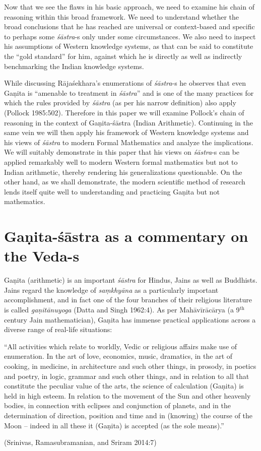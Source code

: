 Now that we see the flaws in his basic approach, we need to examine his chain of reasoning within this broad framework. We need to understand whether the broad conclusions that he has reached are universal or context-based and specific to perhaps some {\sl śāstra}-s only under some circumstances.  We also need to inspect his assumptions of Western knowledge systems, as that can be said to constitute the ``gold standard'' for him, against which he is directly as well as indirectly benchmarking the Indian knowledge systems.

While discussing Rājaśekhara’s enumerations of {\sl śāstra}-s he observes that even Gaṇita is ``amenable to treatment in {\sl śāstra}'' and is one of the many practices for which the rules provided by {\sl śāstra} (as per his narrow definition) also apply (Pollock 1985:502). Therefore in this paper we will examine Pollock’s chain of reasoning in the context of Gaṇita-śāstra (Indian Arithmetic). Continuing in the same vein we will then apply his framework of Western knowledge systems and his views of {\sl śāstra} to modern Formal Mathematics and analyze the implications. We will suitably demonstrate in this paper that his views on {\sl śāstra}-s can be applied remarkably well to modern Western formal mathematics but not to Indian arithmetic, thereby rendering his generalizations questionable. On the other hand, as we shall demonstrate, the modern scientific method of research lends itself quite well to understanding and practicing Gaṇita but not mathematics.

\section*{Gaṇita-śāstra as a commentary on the Veda-s}

Gaṇita (arithmetic) is an important {\sl śāstra} for Hindus, Jains as well as Buddhists. Jains regard the knowledge of {\sl saṃkhyāna} as a particularly important accomplishment, and in fact one of the four branches of their religious literature is called {\sl gaṇitānuyoga} (Datta and Singh 1962:4). As per Mahāvīrācārya (a 9$^{\text{th}}$ century Jain mathematician), Gaṇita has immense practical applications across a diverse range of real-life situations: 
\begin{myquote}
``All activities which relate to worldly, Vedic or religious affairs make use of enumeration. In the art of love, economics, music, dramatics, in the art of cooking, in medicine, in architecture and such other things, in prosody, in poetics and poetry, in logic, grammar and such other things, and in relation to all that constitute the peculiar value of the arts, the science of calculation (Gaṇita) is held in high esteem. In relation to the movement of the Sun and other heavenly bodies, in connection with eclipses and conjunction of planets, and in the determination of direction, position and time and in (knowing) the course of the Moon -- indeed in all these it (Gaṇita) is accepted (as the sole means).''

\hfill (Srinivas, Ramasubramanian, and Sriram 2014:7)
\end{myquote}

